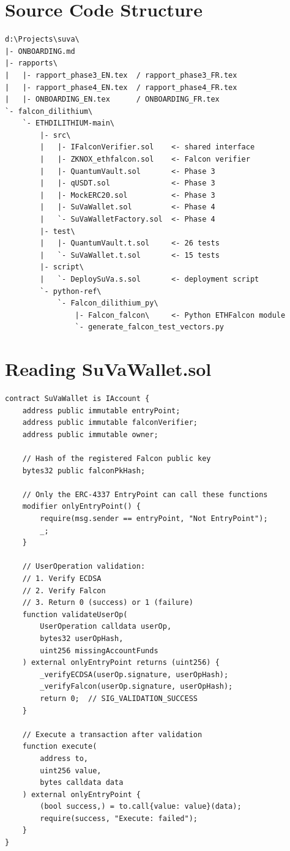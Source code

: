 \documentclass[11pt,a4paper]{article}
\begin{document}
\section{Source Code Structure}

\begin{lstlisting}
d:\Projects\suva\
|- ONBOARDING.md
|- rapports\
|   |- rapport_phase3_EN.tex  / rapport_phase3_FR.tex
|   |- rapport_phase4_EN.tex  / rapport_phase4_FR.tex
|   |- ONBOARDING_EN.tex      / ONBOARDING_FR.tex
`- falcon_dilithium\
    `- ETHDILITHIUM-main\
        |- src\
        |   |- IFalconVerifier.sol    <- shared interface
        |   |- ZKNOX_ethfalcon.sol    <- Falcon verifier
        |   |- QuantumVault.sol       <- Phase 3
        |   |- qUSDT.sol              <- Phase 3
        |   |- MockERC20.sol          <- Phase 3
        |   |- SuVaWallet.sol         <- Phase 4
        |   `- SuVaWalletFactory.sol  <- Phase 4
        |- test\
        |   |- QuantumVault.t.sol     <- 26 tests
        |   `- SuVaWallet.t.sol       <- 15 tests
        |- script\
        |   `- DeploySuVa.s.sol       <- deployment script
        `- python-ref\
            `- Falcon_dilithium_py\
                |- Falcon_falcon\     <- Python ETHFalcon module
                `- generate_falcon_test_vectors.py
\end{lstlisting}

\section{Reading SuVaWallet.sol}

\begin{lstlisting}[style=solidity, caption={SuVaWallet.sol --- annotated structure}]
contract SuVaWallet is IAccount {
    address public immutable entryPoint;
    address public immutable falconVerifier;
    address public immutable owner;

    // Hash of the registered Falcon public key
    bytes32 public falconPkHash;

    // Only the ERC-4337 EntryPoint can call these functions
    modifier onlyEntryPoint() {
        require(msg.sender == entryPoint, "Not EntryPoint");
        _;
    }

    // UserOperation validation:
    // 1. Verify ECDSA
    // 2. Verify Falcon
    // 3. Return 0 (success) or 1 (failure)
    function validateUserOp(
        UserOperation calldata userOp,
        bytes32 userOpHash,
        uint256 missingAccountFunds
    ) external onlyEntryPoint returns (uint256) {
        _verifyECDSA(userOp.signature, userOpHash);
        _verifyFalcon(userOp.signature, userOpHash);
        return 0;  // SIG_VALIDATION_SUCCESS
    }

    // Execute a transaction after validation
    function execute(
        address to,
        uint256 value,
        bytes calldata data
    ) external onlyEntryPoint {
        (bool success,) = to.call{value: value}(data);
        require(success, "Execute: failed");
    }
}
\end{lstlisting}
\end{document}
